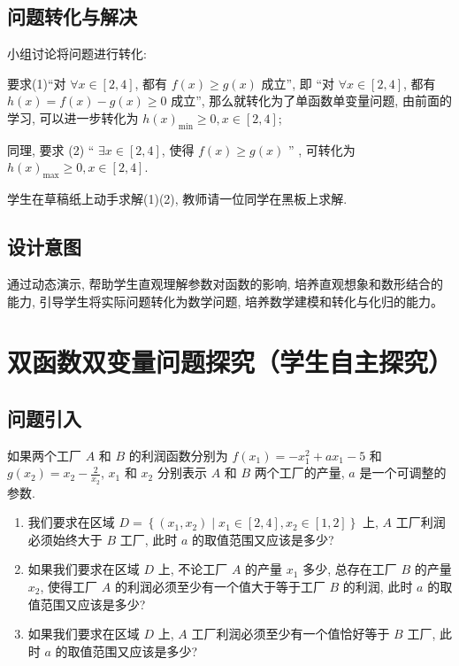 \subsection{问题转化与解决}
小组讨论将问题进行转化:

要求(1)“对 \(\forall x \in  \left\lbrack  {2, 4}\right\rbrack\), 都有 \(f(x)  \geq  g(x)\) 成立”, 即 “对 \(\forall x \in  \left\lbrack  {2, 4}\right\rbrack\), 都有 \(h(x)  = f(x)  - g(x)  \geq  0\) 成立”, 那么就转化为了单函数单变量问题, 由前面的学习, 可以进一步转化为 \(h{(x) }_{\min } \geq  0, x \in  \left\lbrack  {2, 4}\right\rbrack\);

同理, 要求 (2) “ \(\exists x \in  \left\lbrack  {2, 4}\right\rbrack\), 使得 \(f(x)  \geq  g(x)\) ” , 可转化为 \(h{(x) }_{\max } \geq  0, x \in  \left\lbrack  {2, 4}\right\rbrack\).

学生在草稿纸上动手求解(1)(2), 教师请一位同学在黑板上求解.


\subsection{设计意图}
通过动态演示, 帮助学生直观理解参数对函数的影响, 培养直观想象和数形结合的能力, 引导学生将实际问题转化为数学问题, 培养数学建模和转化与化归的能力。


\section{双函数双变量问题探究（学生自主探究）}
\subsection{问题引入}
如果两个工厂 \(A\) 和 \(B\) 的利润函数分别为 \(f\left( {x}_{1}\right)  =  - {x}_{1}^{2} + a{x}_{1} - 5\) 和 \(g\left( {x}_{2}\right)  = {x}_{2} - \frac{2}{{x}_{2}}\), \({x}_{1}\) 和 \({x}_{2}\) 分别表示 \(A\) 和 \(B\) 两个工厂的产量, \(a\) 是一个可调整的参数.

\begin{enumerate}[(1)]
  \item 我们要求在区域 \(D = \left\{  {\left( {{x}_{1}, {x}_{2}}\right)  \mid  {x}_{1} \in  \left\lbrack  {2, 4}\right\rbrack  , {x}_{2} \in  \left\lbrack  {1, 2}\right\rbrack  }\right\}\) 上, \(A\) 工厂利润必须始终大于 \(B\) 工厂, 此时 \(a\) 的取值范围又应该是多少?

  \item 如果我们要求在区域 \(D\) 上, 不论工厂 \(A\) 的产量 \({x}_{1}\) 多少, 总存在工厂 \(B\) 的产量 \({x}_{2}\), 使得工厂 \(A\) 的利润必须至少有一个值大于等于工厂 \(B\) 的利润, 此时 \(a\) 的取值范围又应该是多少?
  
  \item 如果我们要求在区域 \(D\) 上, \(A\) 工厂利润必须至少有一个值恰好等于 \(B\) 工厂, 此时 \(a\) 的取值范围又应该是多少?
\end{enumerate}

